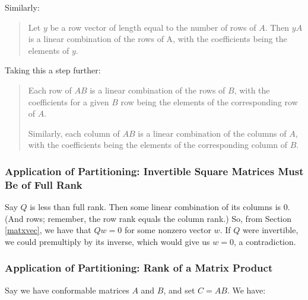 Similarly:

\begin{quote}
Let $y$ be a row vector of length equal to the number of rows of $A$.
Then $yA$ is a linear combination of the rows of A, with the
coefficients being the elements of $y$.
\end{quote}

Taking this a step further:

\begin{quote}

Each row of $AB$ is a linear combination of the rows of $B$, with the
coefficients for a given $B$ row being the elements of the 
corresponding row of $A$.

Similarly, each column of $AB$ is a linear combination of the columns of
$A$, with the coefficients being the elements of the corresponding
column of $B$.

\end{quote}

\subsubsection{Application of Partitioning:  Invertible Square Matrices 
Must Be of Full Rank}
\label{invertmustfull}

Say $Q$ is less than full rank.  Then some linear combination of its
columns is 0.  (And rows; remember, the row rank equals the column
rank.) So, from Section \ref{matxvec}, we have that $Qw = 0$ for some
nonzero vector $w$.  If $Q$ were invertible, we could premultiply by its
inverse, which would give us $w = 0$, a contradiction.

\subsubsection{Application of Partitioning:  Rank of a Matrix Product}

Say we have conformable matrices $A$ and $B$, and set $C = AB$.  We have:

